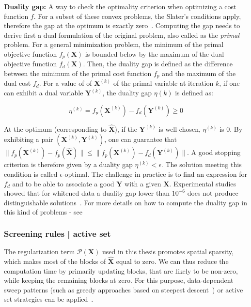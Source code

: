 \textbf{Duality gap:} A way to check the optimality criterion when optimizing a cost function $f$. For a subset of these convex problems, the Slater's conditions apply, therefore the gap at the optimum is exactly zero~\cite{Boyd_Vandenberghe04}. Computing the gap needs to derive first a dual formulation of the original problem, also called as the \textit{primal} problem. For a general minimization problem, the minimum of the primal objective function $f_p(\mathbf{X})$ is bounded below by the maximum of the dual objective function $f_d(\mathbf{X})$. Then, the duality gap is defined as the difference between the minimum of the primal cost function $f_p$ and the maximum of the dual cost $f_d$. For a value of of $\mathbf{X}^{(k)}$ of the primal variable at iteration $k$, if one can exhibit a dual variable $\mathbf{Y}^{(k)}$, the duality gap $\eta{(k)}$ is defined as:

\begin{equation}
\eta^{(k)}=f_p(\mathbf{X}^{(k)})-f_d(\mathbf{Y}^{(k)}) \geq 0
\end{equation}

At the optimum (corresponding to $\hat{\mathbf{X}}$), if the $\mathbf{Y}^{(k)}$ is well chosen, $\eta^{(k)}$ is $0$. By exhibiting a pair $(\mathbf{X}^{(k)}, \mathbf{Y}^{(k)})$, one can guarantee that $\|f_p(\mathbf{X}^{(k)}) - f_p(\hat{\mathbf{X}})\| \leq \|f_p(\mathbf{X}^{(k)})-f_d(\mathbf{Y}^{(k)})\|$. A good stopping criterion is therefore given by a duality gap $\eta^{(k)}<\epsilon$. The solution meeting this condition is called $\epsilon$-optimal. The challenge in practice is to find an expression for $f_d$ and to be able to associate a good $\mathbf{Y}$ with a given $\mathbf{X}$. Experimental studies showed that for whitened data a duality gap lower than $10^{-6}$ does not produce distinguishable solutions~\cite{Gramfort_Kowalski_Hamalainen12}. For more details on how to compute the duality gap in this kind of problems - see~\cite{bach2012optimization,Gramfort_Kowalski_Hamalainen12,strohmeier-etal:16}\\


\subsubsection*{Screening rules | active set}
The regularization term $\mathcal{P}(\mathbf{X})$ used in this thesis promotes spatial sparsity, which makes most of the blocks of $\hat{\mathbf{X}}$ equal to zero. We can thus reduce the computation time by primarily updating blocks, that are likely to be non-zero, while keeping the remaining blocks at zero. For this purpose, data-dependent sweep patterns (such as greedy approaches based on steepest descent~\cite{li-osher:2009,wei2012doa}) or active set strategies can be applied~\cite{friedman-etal:2010,roth-etal:08}.\\

